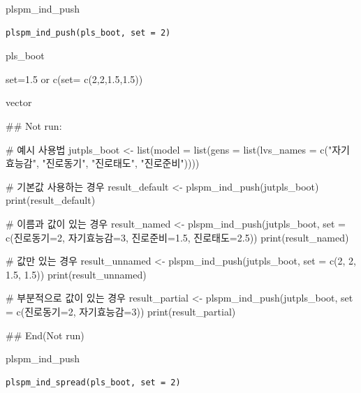 \documentclass[a4paper]{book}
\begin{document}
%
\begin{Description}
plspm\_ind\_push
\end{Description}
%
\begin{Usage}
\begin{verbatim}
plspm_ind_push(pls_boot, set = 2)
\end{verbatim}
\end{Usage}
%
\begin{Arguments}
\begin{ldescription}
\item[\code{pls\_boot}] pls\_boot

\item[\code{set}] set=1.5 or c(set= c(2,2,1.5,1.5))
\end{ldescription}
\end{Arguments}
%
\begin{Value}
vector
\end{Value}
%
\begin{Examples}
\begin{ExampleCode}

\#\# Not run: 

# 예시 사용법
jutpls_boot <- list(model = list(gens = list(lvs_names = c("자기효능감", "진로동기", "진로태도", "진로준비"))))

# 기본값 사용하는 경우
result_default <- plspm_ind_push(jutpls_boot)
print(result_default)

# 이름과 값이 있는 경우
result_named <- plspm_ind_push(jutpls_boot, set = c(진로동기=2, 자기효능감=3, 진로준비=1.5, 진로태도=2.5))
print(result_named)

# 값만 있는 경우
result_unnamed <- plspm_ind_push(jutpls_boot, set = c(2, 2, 1.5, 1.5))
print(result_unnamed)

# 부분적으로 값이 있는 경우
result_partial <- plspm_ind_push(jutpls_boot, set = c(진로동기=2, 자기효능감=3))
print(result_partial)


## End(Not run)



\end{ExampleCode}
\end{Examples}
%
\begin{Description}
plspm\_ind\_push
\end{Description}
%
\begin{Usage}
\begin{verbatim}
plspm_ind_spread(pls_boot, set = 2)
\end{verbatim}
\end{Usage}
\end{document}
